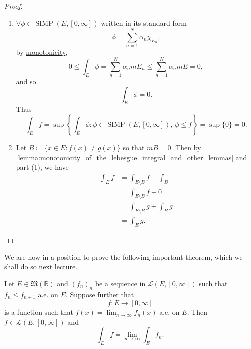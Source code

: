 \documentclass[notoc,notitlepage]{tufte-book}
\DeclareMathOperator{\SIMP}{SIMP}
\begin{document}
\begin{proof}
  \begin{enumerate}
    \item $\forall \phi \in \SIMP(E, [0, \infty])$ written in its standard form
      \begin{equation*}
        \phi = \sum_{n=1}^{N} \alpha_n \chi_{E_n},
      \end{equation*}
      by \hyperref[defn:algebra_of_sets]{monotonicity},
      \begin{equation*}
        0 \leq \int_{E} \phi = \sum_{n=1}^{N} \alpha_n mE_n \leq \sum_{n=1}^{N}
        \alpha_n mE = 0,
      \end{equation*}
      and so
      \begin{equation*}
        \int_{E} \phi = 0.
      \end{equation*}
      Thus
      \begin{equation*}
        \int_{E} f = \sup \left\{ \int_{E} \phi : \phi \in \SIMP(E, [0,
        \infty]),\, \phi \leq f \right\} = \sup \{ 0 \} = 0.
      \end{equation*}

    \item Let $B \coloneqq \{ x \in E : f(x) \neq g(x) \}$ so that $mB = 0$.
      Then by \cref{lemma:monotonicity_of_the_lebesgue_integral_and_other_lemmas} and
      part (1), we have
      \begin{align*}
        \int_{E} f &= \int_{E \setminus B} f + \int_{B} \\
                   &= \int_{E \setminus B} f + 0 \\
                   &= \int_{E \setminus B} g + \int_{B} g \\
                   &= \int_{E} g.
      \end{align*}
  \end{enumerate}
\end{proof}

We are now in a position to prove the following important theorem, which we
shall do so next lecture.

\begin{thmnonum}
  Let $E \in \mathfrak{M}(\mathbb{R})$ and $(f_n)_n$ be a sequence in
  $\mathcal{L}(E, [0, \infty])$ such that $f_n \leq f_{n+1}$ a.e. on $E$.
  Suppose further that
  \begin{equation*}
    f : E \to [0, \infty]
  \end{equation*}
  is a function such that $f(x) = \lim_{n \to \infty} f_n(x)$ a.e. on $E$. Then
  $f \in \mathcal{L}(E, [0, \infty])$ and
  \begin{equation*}
    \int_{E} f = \lim_{n \to \infty} \int_{E} f_n.
  \end{equation*}
\end{thmnonum}
\end{document}
